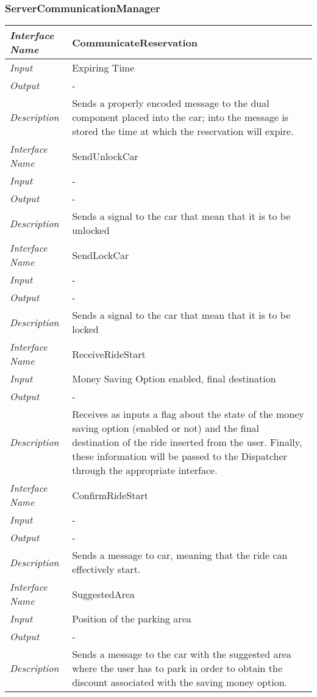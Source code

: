 \documentclass[11pt,a4paper]{report}
\begin{document}
\subsubsection{ServerCommunicationManager}
\begin{tabularx}{\textwidth}{|>{\em}l|X|}
	\hline
	Interface Name& CommunicateReservation\\
	\hline
	Input & Expiring Time\\
	\hline
	Output & -\\
	\hline
	Description &Sends a properly encoded message to the dual component placed into the car; into the message is stored the time at which the reservation will expire.\\
	\hline
	\hline
	Interface Name& SendUnlockCar\\
	\hline
	Input & -\\
	\hline
	Output & -\\
	\hline
	Description &Sends a signal to the car that mean that it is to be unlocked\\
	\hline
	\hline
	Interface Name& SendLockCar\\
	\hline
	Input & -\\
	\hline
	Output & -\\
	\hline
	Description &Sends a signal to the car that mean that it is to be locked\\
	\hline
	\hline
	Interface Name& ReceiveRideStart\\
	\hline
	Input & Money Saving Option enabled, final destination\\
	\hline
	Output & -\\
	\hline
	Description &Receives as inputs a flag about the state of the money saving option (enabled or not) and the final destination of the ride inserted from the user. Finally, these information will be passed to the Dispatcher through the appropriate interface.\\
	\hline
	\hline
	Interface Name& ConfirmRideStart\\
	\hline
	Input & -\\
	\hline
	Output & -\\
	\hline
	Description &Sends a message to car, meaning that the ride can effectively start.\\
	\hline
	\hline
	Interface Name& SuggestedArea\\
	\hline
	Input & Position of the parking area\\
	\hline
	Output & -\\
	\hline
	Description &Sends a message to the car with the suggested area where the user has to park in order to obtain the discount associated with the saving money option.\\

\end{tabularx}
\end{document}
